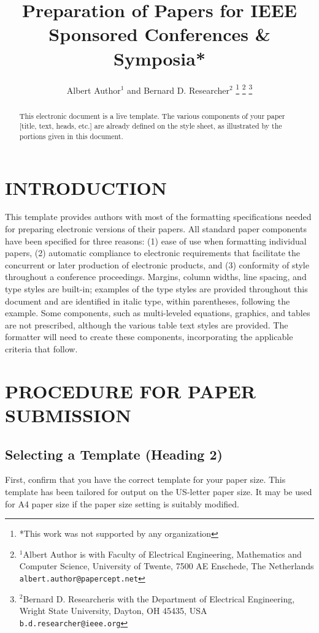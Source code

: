 \documentclass[letterpaper, 10 pt, conference]{ieeeconf}  %
\title{\LARGE \bf
Preparation of Papers for IEEE Sponsored Conferences \& Symposia*
}
\author{Albert Author$^{1}$ and Bernard D. Researcher$^{2}$%
\thanks{*This work was not supported by any organization}%
\thanks{$^{1}$Albert Author is with Faculty of Electrical Engineering, Mathematics and Computer Science,
        University of Twente, 7500 AE Enschede, The Netherlands
        {\tt\small albert.author@papercept.net}}%
\thanks{$^{2}$Bernard D. Researcheris with the Department of Electrical Engineering, Wright State University,
        Dayton, OH 45435, USA
        {\tt\small b.d.researcher@ieee.org}}%
}
\begin{document}
\maketitle
\thispagestyle{empty}
\pagestyle{empty}


\begin{abstract}

This electronic document is a live template. The various components of your paper [title, text, heads, etc.] are already defined on the style sheet, as illustrated by the portions given in this document.

\end{abstract}


\section{INTRODUCTION}

This template provides authors with most of the formatting specifications needed for preparing electronic versions of their papers. All standard paper components have been specified for three reasons: (1) ease of use when formatting individual papers, (2) automatic compliance to electronic requirements that facilitate the concurrent or later production of electronic products, and (3) conformity of style throughout a conference proceedings. Margins, column widths, line spacing, and type styles are built-in; examples of the type styles are provided throughout this document and are identified in italic type, within parentheses, following the example. Some components, such as multi-leveled equations, graphics, and tables are not prescribed, although the various table text styles are provided. The formatter will need to create these components, incorporating the applicable criteria that follow.

\section{PROCEDURE FOR PAPER SUBMISSION}

\subsection{Selecting a Template (Heading 2)}

First, confirm that you have the correct template for your paper size. This template has been tailored for output on the US-letter paper size. 
It may be used for A4 paper size if the paper size setting is suitably modified.
\end{document}
